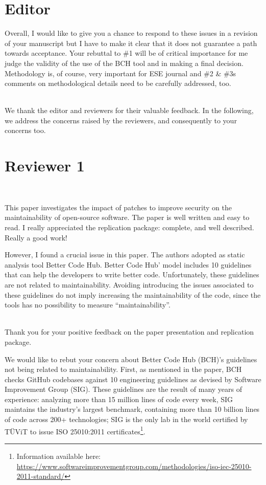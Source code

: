 \documentclass[11pt,fleqn]{article}
\title{\vspace*{-2cm}{\bf Authors' Response to the Review of
 EMSE-D-20-00300:\\
 ``Fixing Vulnerabilities Potentially Hinders Maintainability''}}
\author{Sofia Reis, Rui Abreu, Luis Cruz}
\date{}
\newcommand{\eline}{\vspace*{.75\baselineskip}}
\newcommand{\Referee}[1]{\eline \noindent {\bf Reviewer comment #1:} \\}
\newcommand{\Us}{\eline \noindent {\bf Response:}\\}
\newcommand{\newreviewer}[1]{\section*{Reviewer #1}\vspace*{-1.05\baselineskip}}
\newcommand{\editor}[1]{\section*{Editor #1}\vspace*{-1.05\baselineskip}}
\newenvironment{revcomment}[1][]
{\Referee{#1}\begin{rcomment}}
{\end{rcomment}}
\newenvironment{reveditor}
{\begin{rcomment}}
{\end{rcomment}}
\begin{document}
\maketitle

\editor{}

\begin{reveditor}
    Overall, I would like to give you a chance to respond to 
    these issues in a revision of your manuscript but I have 
    to make it clear that it does not guarantee a path towards 
    acceptance. Your rebuttal to \#1 will be of critical importance 
    for me judge the validity of the use of the BCH tool and in 
    making a final decision. Methodology is, of course, very 
    important for ESE journal and \#2 \& \#3s comments on methodological 
    details need to be carefully addressed, too. 
\end{reveditor}

\Us We thank the editor and reviewers for their valuable feedback. In the 
following, we address the concerns raised by the reviewers, and consequently 
to your concerns too.

\newreviewer{1}

\begin{revcomment}[1.1]

    This paper investigates the impact of patches to improve 
    security on the maintainability of open-source software. 
    The paper is well written and easy to read. I really 
    appreciated the replication package: complete, and well 
    described. Really a good work!
    
    However, I found a crucial issue in this paper. The authors 
    adopted as static analysis tool Better Code Hub. Better Code 
    Hub' model includes 10 guidelines that can help the developers to 
    write better code. Unfortunately, these guidelines are not related 
    to maintainability. Avoiding introducing the issues associated to 
    these guidelines do not imply increasing the maintainability of the 
    code, since the tools has no possibility to measure ``maintainability''.

\end{revcomment}

\Us Thank you for your positive feedback on the paper presentation and replication
package. 

We would like to rebut your concern about Better Code Hub (BCH)'s guidelines not 
being related to maintainability. First, as mentioned in the paper, BCH checks GitHub 
codebases against 10 engineering guidelines as devised by Software Improvement Group 
(SIG). These guidelines are the result of many years of experience: analyzing more 
than 15 million lines of code every week, SIG maintains the industry’s largest 
benchmark, containing more than 10 billion lines of code across 200+ technologies; SIG 
is the only lab in the world certified by TÜViT to issue ISO 25010:2011 
certificates\footnote{Information available here: 
\url{https://www.softwareimprovementgroup.com/methodologies/iso-iec-25010-2011-standard/}}.
\end{document}
